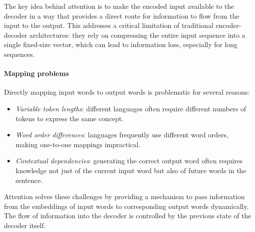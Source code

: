 The key idea behind attention is to make the encoded input available to the decoder in a way that provides a direct route for information to flow from the input to the output. 
This addresses a critical limitation of traditional encoder-decoder architectures: they rely on compressing the entire input sequence into a single fixed-size vector, which can lead to information loss, especially for long sequences.

\paragraph*{Mapping problems}
Directly mapping input words to output words is problematic for several reasons:
\begin{itemize}
    \item \textit{Variable token lengths}: different languages often require different numbers of tokens to express the same concept.
    \item \textit{Word order differences}: languages frequently use different word orders, making one-to-one mappings impractical.
    \item \textit{Contextual dependencies}: generating the correct output word often requires knowledge not just of the current input word but also of future words in the sentence. 
\end{itemize}
\noindent Attention solves these challenges by providing a mechanism to pass information from the embeddings of input words to corresponding output words dynamically. 
The flow of information into the decoder is controlled by the previous state of the decoder itself.

